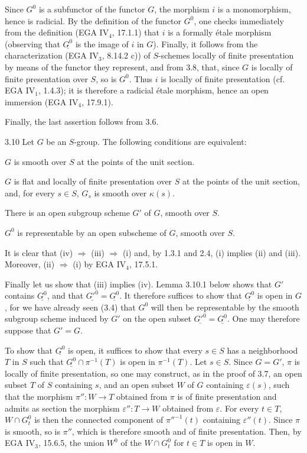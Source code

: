 Since $G^0$ is a subfunctor of the functor $G$, the morphism $i$ is a monomorphism, hence is radicial. By the definition of the functor $G^0$, one checks immediately from the definition (EGA IV$_4$, 17.1.1) that $i$ is a formally étale morphism (observing that $\underline{G^0}$ is the image of $i$ in $G$). Finally, it follows from the characterization (EGA IV$_3$, 8.14.2 c)) of $S$-schemes locally of finite presentation by means of the functor they represent, and from 3.8, that, since $G$ is locally of finite presentation over $S$, so is $G^0$. Thus $i$ is locally of finite presentation (cf. EGA IV$_1$, 1.4.3); it is therefore a radicial étale morphism, hence an open immersion (EGA IV$_4$, 17.9.1).

Finally, the last assertion follows from 3.6.
\begin{theorem}{3.10}\label{VIB.3.10}
Let $G$ be an $S$-group. The following conditions are equivalent:
\begin{enumeratei}
\item $G$ is smooth over $S$ at the points of the unit section.
\item $G$ is flat and locally of finite presentation over $S$ at the points of the unit section, and, for every $s\in S$, $G_s$ is smooth over $\kappa(s)$.
\item There is an open subgroup scheme $G'$ of $G$, smooth over $S$.
\item $G^0$ is representable by an open subscheme of $G$, smooth over $S$.
\end{enumeratei}
\end{theorem}
It is clear that (iv) $\Rightarrow$ (iii) $\Rightarrow$ (i) and, by 1.3.1 and 2.4, (i) implies (ii) and (iii). Moreover, (ii) $\Rightarrow$ (i) by EGA IV$_4$, 17.5.1.

Finally let us show that (iii) implies (iv). Lemma 3.10.1 below shows that $G'$ contains $\underline{G^0}$, and that $\underline{G'^0}=\underline{G^0}$. It therefore suffices to show that $\underline{G^0}$ is open in $G$, for we have already seen (3.4) that $G^0$ will then be representable by the smooth subgroup scheme induced by $G'$ on the open subset $\underline{G'^0}=\underline{G^0}$. One may therefore suppose that $G'=G$.

To show that $\underline{G^0}$ is open, it suffices to show that every $s\in S$ has a neighborhood $T$ in $S$ such that $\underline{G^0}\cap\pi^{-1}(T)$ is open in $\pi^{-1}(T)$. Let $s\in S$. Since $G=G'$, $\pi$ is locally of finite presentation, so one may construct, as in the proof of 3.7, an open subset $T$ of $S$ containing $s$, and an open subset $W$ of $G$ containing $\varepsilon(s)$, such that the morphism $\pi'':W\to T$ obtained from $\pi$ is of finite presentation and admits as section the morphism $\varepsilon'':T\to W$ obtained from $\varepsilon$. For every $t\in T$, $W\cap G_t^0$ is then the connected component of $\pi''^{-1}(t)$ containing $\varepsilon''(t)$. Since $\pi$ is smooth, so is $\pi''$, which is therefore smooth and of finite presentation. Then, by EGA IV$_3$, 15.6.5, the union $W^0$ of the $W\cap G_t^0$ for $t\in T$ is open in $W$.

